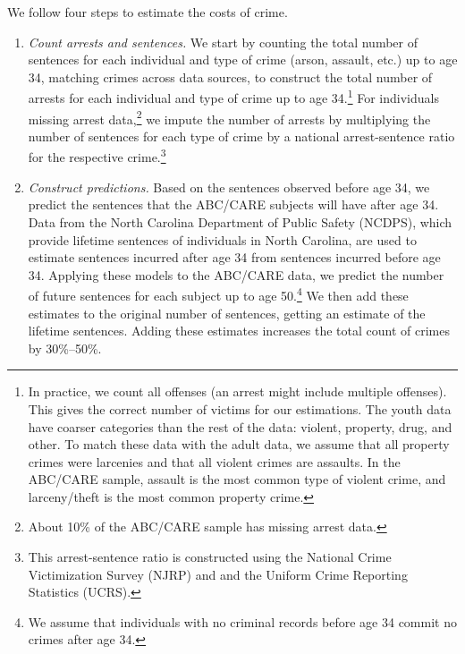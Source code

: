 We follow four steps to estimate the costs of crime.

\begin{enumerate}
\item \textit{Count arrests and sentences.} We start by counting the total number of sentences for each individual and type of crime (arson, assault, etc.) up to age 34, matching crimes across data sources, to construct the total number of  arrests for each individual and type of crime up to age 34.\footnote{In practice, we count all offenses (an arrest might include multiple offenses). This gives the correct number of victims for our estimations. The youth data have coarser categories than the rest of the data: violent, property, drug, and other. To match these data with the adult data, we assume that all property crimes were larcenies and that all violent crimes are assaults. In the ABC/CARE sample, assault is the most common type of violent crime, and larceny/theft is the most common property crime.} For individuals missing arrest data,\footnote{About 10\% of the ABC/CARE sample has missing arrest data.} we impute the number of arrests by multiplying the number of sentences for each type of crime by a national arrest-sentence ratio for the respective crime.\footnote{This arrest-sentence ratio is constructed using the National Crime Victimization Survey (NJRP) and and the Uniform Crime Reporting Statistics (UCRS).}

\item \textit{Construct predictions.} Based on the sentences observed before age 34, we predict the sentences that the ABC/CARE subjects will have after age 34. Data from the North Carolina Department of Public Safety (NCDPS), which provide lifetime sentences of individuals in North Carolina, are used to estimate sentences incurred after age 34 from sentences incurred before age 34. Applying these models to the ABC/CARE data, we predict the number of future sentences for each subject up to age 50.\footnote{We assume that individuals with no criminal records before age 34 commit no crimes after age 34.} We then add these estimates to the original number of sentences, getting an estimate of the lifetime sentences. Adding these estimates increases the total count of crimes by 30\%--50\%.


\end{enumerate}
